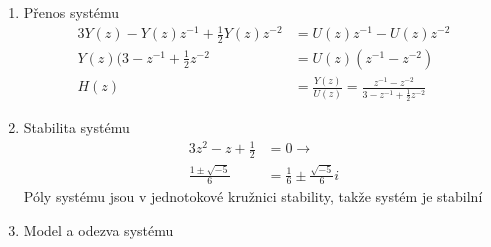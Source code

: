 \documentclass{article}
\begin{document}
\begin{enumerate}
    \item Přenos systému
    \begin{align*}
        3Y(z) - Y(z)z^{-1} + \frac{1}{2}Y(z)z^{-2} &= U(z)z^{-1} - U(z)z^{-2}\\
        Y(z)(3-z^{-1} + \frac{1}{2}z^{-2} &= U(z)(z^{-1} - z^{-2})\\
        H(z) & = \frac{Y(z)}{U(z)} = \frac{z^{-1} - z^{-2}}{3 - z^{-1} + \frac{1}{2}z^{-2}}
    \end{align*}

    \item Stabilita systému
    \begin{align*}
    3z^{2}-z+\frac{1}{2} &= 0 \rightarrow\\
    \frac{1 \pm \sqrt{-5}}{6} &= \frac{1}{6} \pm \frac{\sqrt{-5}}{6}i
    \end{align*}
    Póly systému jsou v jednotokové kružnici stability, takže systém je stabilní

    \item Model a odezva systému


\end{enumerate}
\end{document}
